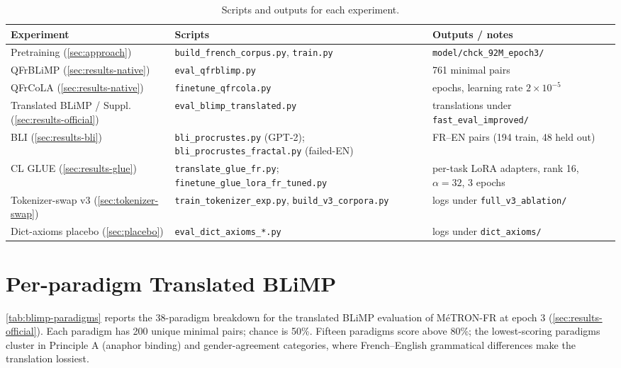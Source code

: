 \documentclass[11pt]{article}
\begin{document}
\begin{table}[h]
\centering
\begin{tabular}{>{\raggedright\arraybackslash}p{2.8cm}>{\raggedright\arraybackslash}p{5.5cm}>{\raggedright\arraybackslash}p{5.5cm}}
\toprule
Experiment & Scripts & Outputs / notes \\
\midrule
Pretraining (\autoref{sec:approach}) & \texttt{build\_french\_corpus.py}, \texttt{train.py} & \texttt{model/chck\_92M\_epoch3/} \\
QFrBLiMP (\autoref{sec:results-native}) & \texttt{eval\_qfrblimp.py} & 1{,}761 minimal pairs \\
QFrCoLA (\autoref{sec:results-native}) & \texttt{finetune\_qfrcola.py} & 3 epochs, learning rate $2\!\times\!10^{-5}$ \\
Translated BLiMP / Suppl. (\autoref{sec:results-official}) & \texttt{eval\_blimp\_translated.py} & translations under \texttt{fast\_eval\_improved/} \\
BLI (\autoref{sec:results-bli}) & \texttt{bli\_procrustes.py} (GPT-2); \newline \texttt{bli\_procrustes\_fractal.py} (failed-EN) & 242 FR--EN pairs (194 train, 48 held out) \\
CL GLUE (\autoref{sec:results-glue}) & \texttt{translate\_glue\_fr.py}; \newline \texttt{finetune\_glue\_lora\_fr\_tuned.py} & 7 per-task LoRA adapters, rank 16, $\alpha\!=\!32$, 3 epochs \\
Tokenizer-swap v3 (\autoref{sec:tokenizer-swap}) & \texttt{train\_tokenizer\_exp.py}, \texttt{build\_v3\_corpora.py} & logs under \texttt{full\_v3\_ablation/} \\
Dict-axioms placebo (\autoref{sec:placebo}) & \texttt{eval\_dict\_axioms\_*.py} & logs under \texttt{dict\_axioms/} \\
\bottomrule
\end{tabular}
\caption{Scripts and outputs for each experiment.}
\label{tab:repro-scripts}
\end{table}

\section{Per-paradigm Translated BLiMP}
\label{app:blimp-paradigms}

\autoref{tab:blimp-paradigms} reports the 38-paradigm breakdown for the translated BLiMP evaluation of MéTRON-FR at epoch 3 (\autoref{sec:results-official}). Each paradigm has 200 unique minimal pairs; chance is 50\%. Fifteen paradigms score above 80\%; the lowest-scoring paradigms cluster in Principle A (anaphor binding) and gender-agreement categories, where French--English grammatical differences make the translation lossiest.
\end{document}
